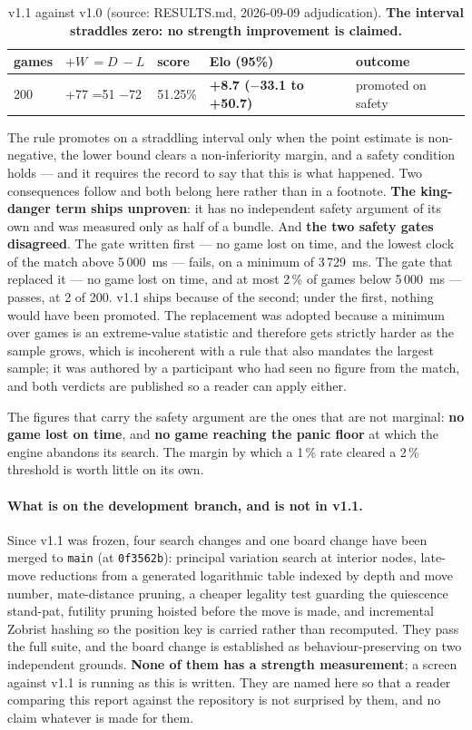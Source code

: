 \documentclass[11pt,a4paper]{article}
\newcommand{\src}[1]{{\small(source: #1)}}
\newcommand{\code}[1]{\texttt{#1}}
\begin{document}
\begin{table}[H]\centering\small
\begin{tabular}{@{}lllll@{}}
\toprule
games & $+W\ =D\ -L$ & score & Elo (95\%) & outcome \\
\midrule
200 & +77 =51 $-$72 & 51.25\% & \textbf{+8.7 ($-$33.1 to +50.7)} & promoted on safety \\
\bottomrule
\end{tabular}
\caption{v1.1 against v1.0 \src{RESULTS.md, 2026-09-09 adjudication}. \textbf{The interval straddles
zero: no strength improvement is claimed.}}
\end{table}

The rule promotes on a straddling interval only when the point estimate is non-negative, the lower
bound clears a non-inferiority margin, and a safety condition holds --- and it requires the record to
say that this is what happened. Two consequences follow and both belong here rather than in a
footnote. \textbf{The king-danger term ships unproven}: it has no independent safety argument of its own
and was measured only as half of a bundle. And \textbf{the two safety gates disagreed}. The gate
written first --- no game lost on time, and the lowest clock of the match above 5\,000~ms --- fails,
on a minimum of 3\,729~ms. The gate that replaced it --- no game lost on time, and at most 2\,\% of
games below 5\,000~ms --- passes, at 2 of 200. v1.1 ships because of the second; under the first,
nothing would have been promoted. The replacement was adopted because a minimum over games is an
extreme-value statistic and therefore gets strictly harder as the sample grows, which is incoherent
with a rule that also mandates the largest sample; it was authored by a participant who had seen no
figure from the match, and both verdicts are published so a reader can apply either.

The figures that carry the safety argument are the ones that are not marginal: \textbf{no game lost on
time}, and \textbf{no game reaching the panic floor} at which the engine abandons its search. The
margin by which a 1\,\% rate cleared a 2\,\% threshold is worth little on its own.

\paragraph{What is on the development branch, and is not in v1.1.} Since v1.1 was frozen, four search
changes and one board change have been merged to \code{main} (at \code{0f3562b}): principal variation
search at interior nodes, late-move reductions from a generated logarithmic table indexed by depth and
move number, mate-distance pruning, a cheaper legality test guarding the quiescence stand-pat, futility
pruning hoisted before the move is made, and incremental Zobrist hashing so the position key is carried
rather than recomputed. They pass the full suite, and the board change is established as
behaviour-preserving on two independent grounds. \textbf{None of them has a strength measurement}; a
screen against v1.1 is running as this is written. They are named here so that a reader comparing this
report against the repository is not surprised by them, and no claim whatever is made for them.
\end{document}
